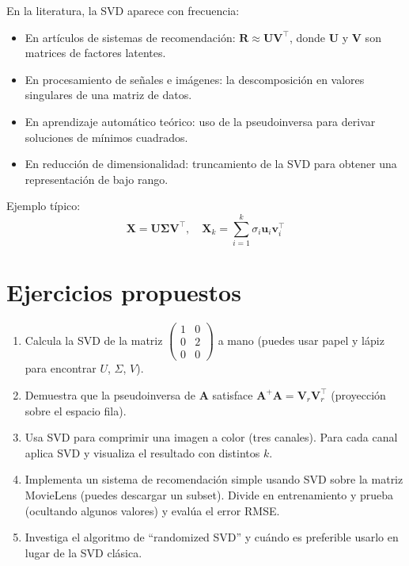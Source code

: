 \documentclass[12pt,a4paper,openany,oneside]{book}
\begin{document}
En la literatura, la SVD aparece con frecuencia:

\begin{itemize}
    \item En artículos de sistemas de recomendación: $\mathbf{R} \approx \mathbf{U}\mathbf{V}^\top$, donde $\mathbf{U}$ y $\mathbf{V}$ son matrices de factores latentes.
    \item En procesamiento de señales e imágenes: la descomposición en valores singulares de una matriz de datos.
    \item En aprendizaje automático teórico: uso de la pseudoinversa para derivar soluciones de mínimos cuadrados.
    \item En reducción de dimensionalidad: truncamiento de la SVD para obtener una representación de bajo rango.
\end{itemize}

Ejemplo típico:
\[
\mathbf{X} = \mathbf{U} \boldsymbol{\Sigma} \mathbf{V}^\top, \quad \mathbf{X}_k = \sum_{i=1}^k \sigma_i \mathbf{u}_i \mathbf{v}_i^\top
\]

\section{Ejercicios propuestos}

\begin{enumerate}
    \item Calcula la SVD de la matriz $\begin{pmatrix} 1 & 0 \\ 0 & 2 \\ 0 & 0 \end{pmatrix}$ a mano (puedes usar papel y lápiz para encontrar $U$, $\Sigma$, $V$).
    \item Demuestra que la pseudoinversa de $\mathbf{A}$ satisface $\mathbf{A}^+ \mathbf{A} = \mathbf{V}_r \mathbf{V}_r^\top$ (proyección sobre el espacio fila).
    \item Usa SVD para comprimir una imagen a color (tres canales). Para cada canal aplica SVD y visualiza el resultado con distintos $k$.
    \item Implementa un sistema de recomendación simple usando SVD sobre la matriz MovieLens (puedes descargar un subset). Divide en entrenamiento y prueba (ocultando algunos valores) y evalúa el error RMSE.
    \item Investiga el algoritmo de ``randomized SVD'' y cuándo es preferible usarlo en lugar de la SVD clásica.
\end{enumerate}
\end{document}

